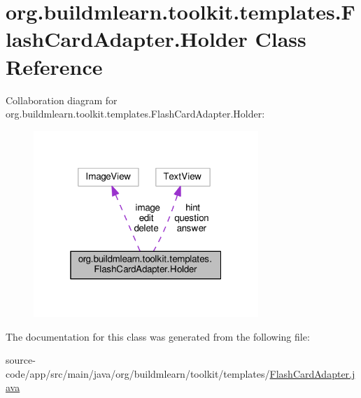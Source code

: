 \hypertarget{classorg_1_1buildmlearn_1_1toolkit_1_1templates_1_1FlashCardAdapter_1_1Holder}{}\section{org.\+buildmlearn.\+toolkit.\+templates.\+Flash\+Card\+Adapter.\+Holder Class Reference}
\label{classorg_1_1buildmlearn_1_1toolkit_1_1templates_1_1FlashCardAdapter_1_1Holder}


Collaboration diagram for org.\+buildmlearn.\+toolkit.\+templates.\+Flash\+Card\+Adapter.\+Holder\+:
\nopagebreak
\begin{figure}[H]
\begin{center}
\leavevmode
\includegraphics[width=241pt]{classorg_1_1buildmlearn_1_1toolkit_1_1templates_1_1FlashCardAdapter_1_1Holder__coll__graph}
\end{center}
\end{figure}


The documentation for this class was generated from the following file\+:\begin{DoxyCompactItemize}
\item 
source-\/code/app/src/main/java/org/buildmlearn/toolkit/templates/\hyperlink{FlashCardAdapter_8java}{Flash\+Card\+Adapter.\+java}\end{DoxyCompactItemize}
